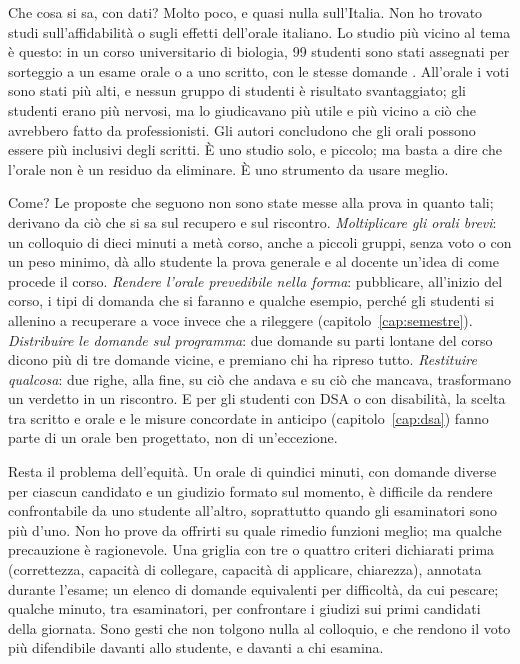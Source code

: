 Che cosa si sa, con dati? Molto poco, e quasi nulla sull'Italia.
Non ho trovato studi sull'affidabilità o sugli effetti dell'orale
italiano. Lo studio più vicino al tema è questo: in un
corso universitario di biologia, 99 studenti sono stati assegnati per sorteggio a un
esame orale o a uno scritto, con le stesse domande
\parencite{huxham2012}. All'orale i voti sono stati più alti, e nessun
gruppo di studenti è risultato svantaggiato; gli studenti erano più
nervosi, ma lo giudicavano più utile e più vicino a ciò che avrebbero
fatto da professionisti. Gli autori concludono che gli orali possono
essere più inclusivi degli scritti. È uno studio solo, e piccolo; ma
basta a dire che l'orale non è un residuo da eliminare. È uno
strumento da usare meglio.

Come? Le proposte che seguono non sono state messe alla prova in
quanto tali; derivano da ciò che si sa sul recupero e sul
riscontro. \emph{Moltiplicare gli orali brevi}: un colloquio di dieci
minuti a metà corso, anche a piccoli gruppi, senza voto o con un peso
minimo, dà allo studente la prova generale e al docente un'idea di come
procede il corso. \emph{Rendere l'orale prevedibile nella forma}:
pubblicare, all'inizio del corso, i tipi di domanda che si faranno e
qualche esempio, perché gli studenti si allenino a recuperare a voce
invece che a rileggere (capitolo~\ref{cap:semestre}). \emph{Distribuire
le domande sul programma}: due domande su parti lontane del corso
dicono più di tre domande vicine, e premiano chi ha ripreso tutto.
\emph{Restituire qualcosa}: due righe, alla fine, su ciò che andava e
su ciò che mancava, trasformano un verdetto in un riscontro. E per gli
studenti con DSA o con disabilità, la scelta tra scritto e orale e
le misure concordate in anticipo (capitolo~\ref{cap:dsa}) fanno parte
di un orale ben progettato, non di un'eccezione.

Resta il problema dell'equità. Un orale di quindici minuti, con
domande diverse per ciascun candidato e un giudizio formato sul
momento, è difficile da rendere confrontabile da uno studente
all'altro, soprattutto quando gli esaminatori sono più d'uno. Non ho
prove da offrirti su quale rimedio funzioni meglio; ma qualche
precauzione è ragionevole. Una griglia con tre o quattro criteri
dichiarati prima (correttezza, capacità di collegare, capacità di
applicare, chiarezza), annotata durante l'esame; un elenco di domande
equivalenti per difficoltà, da cui pescare; qualche minuto, tra
esaminatori, per confrontare i giudizi sui primi candidati della
giornata. Sono gesti che non tolgono nulla al colloquio, e che
rendono il voto più difendibile davanti allo studente, e davanti a
chi esamina.

